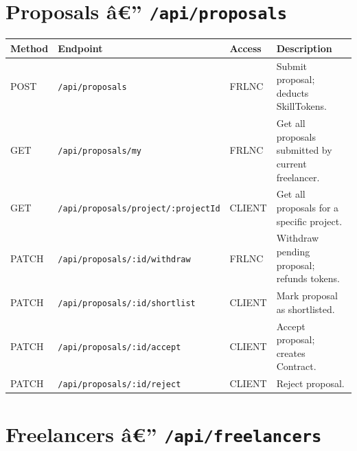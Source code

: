 \section*{Proposals â€” \texttt{/api/proposals}}

\begin{longtable}{p{1.5cm} p{6cm} p{1.5cm} p{5cm}}
\toprule
\textbf{Method} & \textbf{Endpoint} & \textbf{Access} & \textbf{Description} \\
\midrule
\endhead
\bottomrule
\endfoot
POST   & \texttt{/api/proposals}                          & FRLNC  & Submit proposal; deducts SkillTokens. \\
GET    & \texttt{/api/proposals/my}                        & FRLNC  & Get all proposals submitted by current freelancer. \\
GET    & \texttt{/api/proposals/project/:projectId}        & CLIENT & Get all proposals for a specific project. \\
PATCH  & \texttt{/api/proposals/:id/withdraw}              & FRLNC  & Withdraw pending proposal; refunds tokens. \\
PATCH  & \texttt{/api/proposals/:id/shortlist}             & CLIENT & Mark proposal as shortlisted. \\
PATCH  & \texttt{/api/proposals/:id/accept}                & CLIENT & Accept proposal; creates Contract. \\
PATCH  & \texttt{/api/proposals/:id/reject}                & CLIENT & Reject proposal. \\
\end{longtable}

\section*{Freelancers â€” \texttt{/api/freelancers}}

